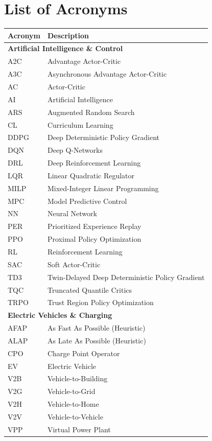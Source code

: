 \section*{List of Acronyms} %

\begin{longtable}{ll}
\textbf{Acronym} & \textbf{Description} \\
\hline
\endhead %

\multicolumn{2}{l}{\textbf{Artificial Intelligence \& Control}} \\
A2C & Advantage Actor-Critic \\
A3C & Asynchronous Advantage Actor-Critic \\ 
AC & Actor-Critic \\
AI & Artificial Intelligence \\
ARS & Augmented Random Search \\
CL & Curriculum Learning \\
DDPG & Deep Deterministic Policy Gradient \\
DQN & Deep Q-Networks \\
DRL & Deep Reinforcement Learning \\
LQR & Linear Quadratic Regulator \\
MILP & Mixed-Integer Linear Programming \\
MPC & Model Predictive Control \\
NN & Neural Network \\
PER & Prioritized Experience Replay \\
PPO & Proximal Policy Optimization \\
RL & Reinforcement Learning \\
SAC & Soft Actor-Critic \\
TD3 & Twin-Delayed Deep Deterministic Policy Gradient \\
TQC & Truncated Quantile Critics \\
TRPO & Trust Region Policy Optimization \\
\hline

\multicolumn{2}{l}{\textbf{Electric Vehicles \& Charging}} \\
AFAP & As Fast As Possible (Heuristic) \\
ALAP & As Late As Possible (Heuristic) \\
CPO & Charge Point Operator \\
EV & Electric Vehicle \\
V2B & Vehicle-to-Building \\
V2G & Vehicle-to-Grid \\
V2H & Vehicle-to-Home \\
V2V & Vehicle-to-Vehicle \\
VPP & Virtual Power Plant \\
\hline


\end{longtable}
